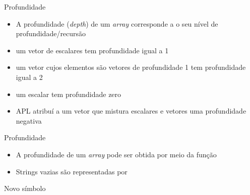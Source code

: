 \begin{frame}[fragile]{Profundidade}

    \begin{itemize}
        \item A profundidade (\textit{depth}) de um \textit{array} corresponde a o seu nível de profundidade/recursão
        \pause

        \item um vetor de escalares tem profundidade igual a 1
        \pause

        \item um vetor cujos elementos são vetores de profundidade 1 tem profundidade igual a 2
        \pause

        \item um escalar tem profundidade zero
        \pause

        \item APL atribuí a um vetor que mistura escalares e vetores uma profundidade negativa
    \end{itemize}

\end{frame}

\begin{frame}[fragile]{Profundidade}

    \begin{itemize}
        \item A profundidade de um \textit{array} pode ser obtida por meio da função 
        \pause

        \item Strings vazias são representadas por 
    \end{itemize}

\end{frame}

\begin{frame}[fragile]{Novo símbolo}


\end{frame}

